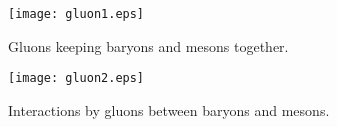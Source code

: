 \begin{figure}\begin{center}
\texttt{[image: gluon1.eps]}%
\caption{Gluons keeping baryons and mesons together.}\label{fig:gluon1}
\end{center}\end{figure}

\begin{figure}\begin{center}
\texttt{[image: gluon2.eps]}%
\caption{Interactions by gluons between baryons and mesons.}\label{fig:gluon2}
\end{center}\end{figure}



